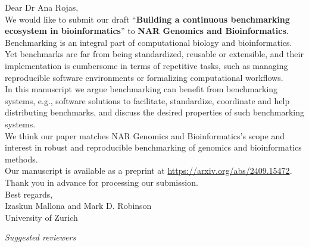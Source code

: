\documentclass[a4paper]{article}
\newcommand{\submission}{Building a continuous benchmarking ecosystem in bioinformatics}
\newcommand{\journal}{NAR Genomics and Bioinformatics}
\newcommand{\submitter}{Izaskun Mallona and Mark D. Robinson}
\newcommand{\editor}{Dr Ana Rojas}
\begin{document}
Dear \editor,\\

We would like to submit our draft ``\textbf{\submission}'' to \textbf{\journal}.\\

Benchmarking is an integral part of computational biology and bioinformatics. Yet benchmarks are far from being standardized, reusable or extensible, and their implementation is cumbersome in terms of repetitive tasks, such as managing reproducible software environments or formalizing computational workflows.\\ 

In this manuscript we argue benchmarking can benefit from benchmarking systems, e.g., software solutions to facilitate, standardize, coordinate and help distributing benchmarks, and discuss the desired properties of such benchmarking systems.\\

We think our paper matches \journal's scope and interest in robust and reproducible benchmarking of genomics and bioinformatics methods.\\

Our manuscript is available as a preprint at \url{https://arxiv.org/abs/2409.15472}.\\

Thank you in advance for processing our submission. \\

Best regards,\\

\submitter\\
\indent University of Zurich\\

\vspace{1cm}

\textit{Suggested reviewers}
\end{document}
